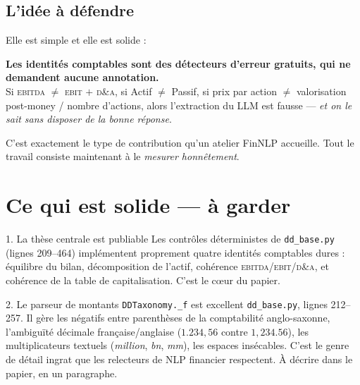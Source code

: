\documentclass[11pt,a4paper]{article}
\newcommand{\fic}[1]{\texttt{\small #1}}
\begin{document}
\subsection*{L'idée à défendre}

Elle est simple et elle est solide :

\begin{center}
\begin{tcolorbox}[colback=white, colframe=cExp, boxrule=1pt, arc=2pt, width=0.93\textwidth]
\centering
\textbf{Les identités comptables sont des détecteurs d'erreur gratuits,
qui ne demandent aucune annotation.}\\[4pt]
\small
Si \textsc{ebitda} $\neq$ \textsc{ebit} $+$ \textsc{d\&a}, si Actif $\neq$
Passif, si prix par action $\neq$ valorisation post-money / nombre d'actions,
alors l'extraction du LLM est fausse --- \emph{et on le sait sans disposer de
la bonne réponse}.
\end{tcolorbox}
\end{center}

C'est exactement le type de contribution qu'un atelier FinNLP accueille. Tout
le travail consiste maintenant à le \emph{mesurer honnêtement}.

\section{Ce qui est solide --- à garder}
\label{sec:solide}

\begin{bon}{1. La thèse centrale est publiable}
Les contrôles déterministes de \fic{dd\_base.py} (lignes 209--464) implémentent
proprement quatre identités comptables dures : équilibre du bilan,
décomposition de l'actif, cohérence \textsc{ebitda}/\textsc{ebit}/\textsc{d\&a},
et cohérence de la table de capitalisation. C'est le c\oe ur du papier.
\end{bon}

\begin{bon}{2. Le parseur de montants \fic{DDTaxonomy.\_f} est excellent}
\fic{dd\_base.py}, lignes 212--257. Il gère les négatifs entre parenthèses de la
comptabilité anglo-saxonne, l'ambiguïté décimale française/anglaise
($1.234{,}56$ contre $1{,}234.56$), les multiplicateurs textuels
(\textit{million}, \textit{bn}, \textit{mm}), les espaces insécables. C'est le
genre de détail ingrat que les relecteurs de NLP financier respectent. À
décrire dans le papier, en un paragraphe.
\end{bon}
\end{document}
